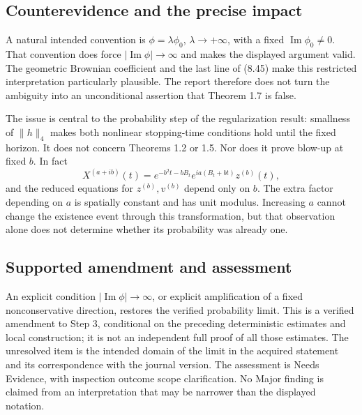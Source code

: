 \documentclass[10pt]{article}
\begin{document}
\subsection*{Counterevidence and the precise impact}
A natural intended convention is \(\phi=\lambda\phi_0\), \(\lambda\to+\infty\), with a fixed \(\operatorname{Im}\phi_0\ne0\). That convention does force \(|\operatorname{Im}\phi|\to\infty\) and makes the displayed argument valid. The geometric Brownian coefficient and the last line of (8.45) make this restricted interpretation particularly plausible. The report therefore does not turn the ambiguity into an unconditional assertion that Theorem 1.7 is false.\par
The issue is central to the probability step of the regularization result: smallness of \(\|h\|_4\) makes both nonlinear stopping-time conditions hold until the fixed horizon. It does not concern Theorems 1.2 or 1.5. Nor does it prove blow-up at fixed \(b\). In fact \[X^{(a+ib)}(t)
 =e^{-b^2t-bB_t}e^{ia(B_t+bt)}z^{(b)}(t),\] and the reduced equations for \(z^{(b)},v^{(b)}\) depend only on \(b\). The extra factor depending on \(a\) is spatially constant and has unit modulus. Increasing \(a\) cannot change the existence event through this transformation, but that observation alone does not determine whether its probability was already one.\par
\subsection*{Supported amendment and assessment}
An explicit condition \(|\operatorname{Im}\phi|\to\infty\), or explicit amplification of a fixed nonconservative direction, restores the verified probability limit. This is a verified amendment to Step 3, conditional on the preceding deterministic estimates and local construction; it is not an independent full proof of all those estimates. The unresolved item is the intended domain of the limit in the acquired statement and its correspondence with the journal version. The assessment is Needs Evidence, with inspection outcome scope clarification. No Major finding is claimed from an interpretation that may be narrower than the displayed notation.\par
\end{document}
